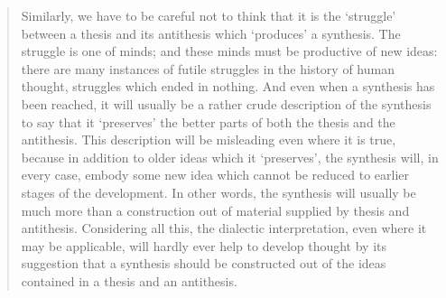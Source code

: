 










\begin{quote}
    Similarly, we have to be careful not to think that it is the ‘struggle’ between a thesis and its antithesis which ‘produces’ a synthesis. The struggle is one of minds; and these minds must be productive of new ideas: there are many instances of futile struggles in the history of human thought, struggles which ended in nothing. And even when a synthesis has been reached, it will usually be a rather crude description of the synthesis to say that it ‘preserves’ the better parts of both the thesis and the antithesis. This description will be misleading even where it is true, because in addition to older ideas which it ‘preserves’, the synthesis will, in every case, embody some new idea which cannot be reduced to earlier stages of the development. In other words, the synthesis will usually be much more than a construction out of material supplied by thesis and antithesis. Considering all this, the dialectic interpretation, even where it may be applicable, will hardly ever help to develop thought by its suggestion that a synthesis should be constructed out of the ideas contained in a thesis and an antithesis. 
    \citep{PopperCR1963}
\end{quote}



